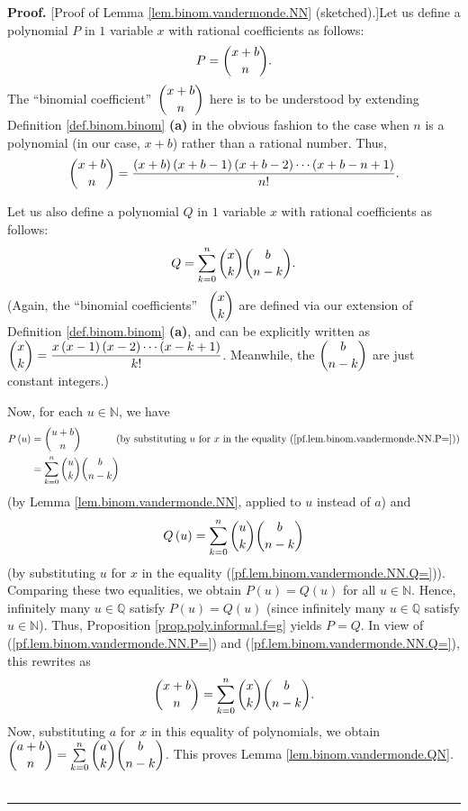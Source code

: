 \documentclass[numbers=enddot,12pt,final,onecolumn,notitlepage]{scrartcl}%
\numberwithin{exer}{subsection}
\theoremstyle{definition}
\newenvironment{proof}[1][Proof]{\noindent\textbf{#1.} }{\ \rule{0.5em}{0.5em}}
\let\sumnonlimits\sum
\renewcommand{\sum}{\sumnonlimits\limits}
\begin{document}
\begin{proof}
[Proof of Lemma \ref{lem.binom.vandermonde.NN} (sketched).]Let us define a
polynomial $P$ in $1$ variable $x$ with rational coefficients as follows:%
\begin{equation}
P=\dbinom{x+b}{n}. \label{pf.lem.binom.vandermonde.NN.P=}%
\end{equation}
The \textquotedblleft binomial coefficient\textquotedblright\ $\dbinom{x+b}%
{n}$ here is to be understood by extending Definition \ref{def.binom.binom}
\textbf{(a)} in the obvious fashion to the case when $n$ is a polynomial (in
our case, $x+b$) rather than a rational number. Thus,%
\[
\dbinom{x+b}{n}=\dfrac{\left(  x+b\right)  \left(  x+b-1\right)  \left(
x+b-2\right)  \cdots\left(  x+b-n+1\right)  }{n!}.
\]


Let us also define a polynomial $Q$ in $1$ variable $x$ with rational
coefficients as follows:%
\begin{equation}
Q=\sum_{k=0}^{n}\dbinom{x}{k}\dbinom{b}{n-k}.
\label{pf.lem.binom.vandermonde.NN.Q=}%
\end{equation}
(Again, the \textquotedblleft binomial coefficients\textquotedblright%
\ $\dbinom{x}{k}$ are defined via our extension of Definition
\ref{def.binom.binom} \textbf{(a)}, and can be explicitly written as
$\dbinom{x}{k}=\dfrac{x\left(  x-1\right)  \left(  x-2\right)  \cdots\left(
x-k+1\right)  }{k!}$. Meanwhile, the $\dbinom{b}{n-k}$ are just constant integers.)

Now, for each $u\in\mathbb{N}$, we have%
\begin{align*}
P\left(  u\right)   &  =\dbinom{u+b}{n}\ \ \ \ \ \ \ \ \ \ \left(  \text{by
substituting }u\text{ for }x\text{ in the equality
(\ref{pf.lem.binom.vandermonde.NN.P=})}\right) \\
&  =\sum_{k=0}^{n}\dbinom{u}{k}\dbinom{b}{n-k}%
\end{align*}
(by Lemma \ref{lem.binom.vandermonde.NN}, applied to $u$ instead of $a$) and%
\[
Q\left(  u\right)  =\sum_{k=0}^{n}\dbinom{u}{k}\dbinom{b}{n-k}%
\]
(by substituting $u$ for $x$ in the equality
(\ref{pf.lem.binom.vandermonde.NN.Q=})). Comparing these two equalities, we
obtain $P\left(  u\right)  =Q\left(  u\right)  $ for all $u\in\mathbb{N}$.
Hence, infinitely many $u\in\mathbb{Q}$ satisfy $P\left(  u\right)  =Q\left(
u\right)  $ (since infinitely many $u\in\mathbb{Q}$ satisfy $u\in\mathbb{N}$).
Thus, Proposition \ref{prop.poly.informal.f=g} yields $P=Q$. In view of
(\ref{pf.lem.binom.vandermonde.NN.P=}) and
(\ref{pf.lem.binom.vandermonde.NN.Q=}), this rewrites as%
\begin{equation}
\dbinom{x+b}{n}=\sum_{k=0}^{n}\dbinom{x}{k}\dbinom{b}{n-k}.
\label{pf.lem.binom.vandermonde.NN.final}%
\end{equation}
Now, substituting $a$ for $x$ in this equality of polynomials, we obtain
$\dbinom{a+b}{n}=\sum_{k=0}^{n}\dbinom{a}{k}\dbinom{b}{n-k}$. This proves
Lemma \ref{lem.binom.vandermonde.QN}.
\end{proof}
\end{document}
